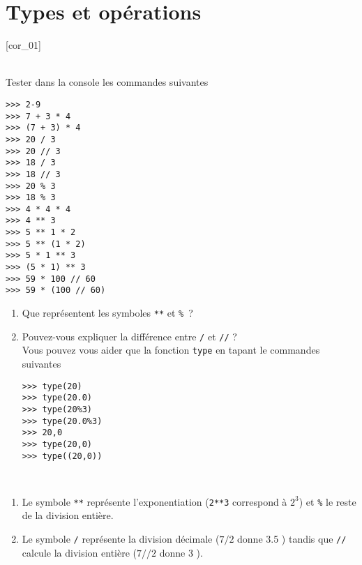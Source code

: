 \documentclass[a4paper,12pt]{article}
\newcommand{\numero}{6}                                    %
\begin{document}


\setcounter{section}{\numero}
\section{Types et opérations}				
[cor_01]

\exo{}  ~\\ 
Tester dans la console \py les commandes suivantes
\begin{multicols}{3}
	\begin{lstlisting}[numbers=none]
>>> 2-9
>>> 7 + 3 * 4
>>> (7 + 3) * 4
>>> 20 / 3
>>> 20 // 3
>>> 18 / 3
>>> 18 // 3
>>> 20 % 3
>>> 18 % 3
>>> 4 * 4 * 4
>>> 4 ** 3
>>> 5 ** 1 * 2
>>> 5 ** (1 * 2)
>>> 5 * 1 ** 3
>>> (5 * 1) ** 3
>>> 59 * 100 // 60
>>> 59 * (100 // 60)
	\end{lstlisting}
\end{multicols}
\begin{enumerate}
	\item Que représentent les symboles \lstinline{**} et \lstinline{%} ?
		\item Pouvez-vous expliquer la différence entre \lstinline{/} et \lstinline{//} ?\\
		Vous pouvez vous aider que la fonction \lstinline{type} en tapant le commandes suivantes
		\begin{multicols}{2}
			\begin{lstlisting}[numbers=none]
>>> type(20) 
>>> type(20.0)
>>> type(20%3) 
>>> type(20.0%3) 
>>> 20,0
>>> type(20,0)
>>> type((20,0))
			\end{lstlisting}
		\end{multicols}
	\end{enumerate}

	\begin{correction}
		~\\ 
		\begin{enumerate}
	\item Le symbole \lstinline{**} représente l'exponentiation (\lstinline{2**3} correspond à $2^3$) et \lstinline{%} le reste de la division entière.
	\item Le symbole \lstinline{/} représente la division décimale ($7/2$ donne 3.5 ) tandis que \lstinline{//} calcule la division entière ($7//2$ donne 3 ).
 		\end{enumerate}
	\end{correction}
\finexo
\end{document}
